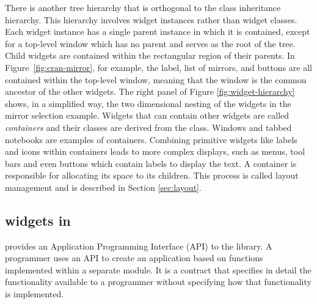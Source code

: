 \documentclass[article,shortnames]{jss}
\begin{document}
There is another tree hierarchy that is orthogonal to the class
inheritance hierarchy. This hierarchy involves widget instances rather
than widget classes. Each widget instance has a single parent instance
in which it is contained, except for a top-level window which has no
parent
and serves as the root of the tree. Child widgets are contained within
the rectangular region of their parents.
In Figure~\ref{fig:cran-mirror}, for
example, the label, list of mirrors, and buttons are all contained
within the top-level window, meaning that the window is the common
ancestor of the other widgets.  The right panel of Figure
\ref{fig:widget-hierarchy} shows, in a simplified way, the two
dimensional nesting of the widgets in the mirror selection
example. Widgets that can contain other widgets are called
\emph{containers} and their classes are derived from the
 class. Windows and tabbed notebooks are examples
of containers.  Combining primitive widgets like labels and icons
within containers leads to more complex displays, such as menus,
tool bars and even buttons which contain labels to display the text. A
container is responsible for allocating its space to its
children. This process is called layout management and is described in
Section \ref{sec:layout}.

\subsection[GTK+ widgets in R]{ widgets in }
 provides an Application Programming Interface (API) to the
library. A programmer uses an API to create an application based on
functions implemented
within a separate module. It is a contract that specifies in detail
the functionality available to a programmer without specifying how
that functionality is implemented. 
 
\end{document}
